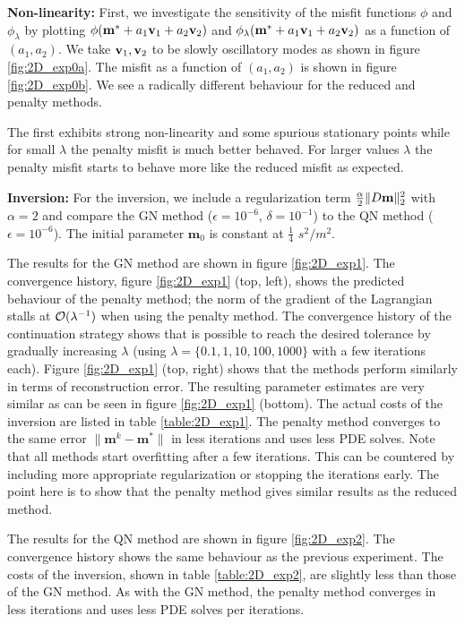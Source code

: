 \documentclass{iopart}
\begin{document}
\textbf{Non-linearity:}
First, we investigate the sensitivity of the misfit functions $\phi$ and $\phi_{\lambda}$ by plotting $\phi(\mathbf{m}^* + a_1 \mathbf{v}_1 + a_2\mathbf{v}_2)$ and $\phi_{\lambda}(\mathbf{m}^* + a_1 \mathbf{v}_1 + a_2\mathbf{v}_2)$ as a function of $(a_1,a_2)$. 
We take $\mathbf{v}_1, \mathbf{v}_2$ to be slowly oscillatory modes as shown in figure \ref{fig:2D_exp0a}. The misfit as a function of $(a_1,a_2)$ is shown in figure \ref{fig:2D_exp0b}. We see a radically different behaviour for the reduced and penalty methods.

The first exhibits strong non-linearity and some spurious stationary points while for small $\lambda$ the penalty misfit is much better behaved. For larger values $\lambda$ the penalty misfit starts to behave more like the reduced misfit as expected.

\textbf{Inversion:}
For the inversion, we include a regularization term $\frac{\alpha}{2} \|D\mathbf{m}\|_2^2$ with $\alpha = 2$ and compare  the GN method ($\epsilon=10^{-6}$, $\delta=10^{-1}$) to the QN method ($\epsilon=10^{-6}$). The initial parameter $\mathbf{m}_0$ is constant at $\frac{1}{4}$ $s^2/m^2$.

The results for the GN method are shown in figure \ref{fig:2D_exp1}.
The convergence history, figure \ref{fig:2D_exp1} (top, left), shows the predicted behaviour of the penalty method; the norm of the gradient of the Lagrangian stalls at $\mathcal{O}(\lambda^{-1})$ when using the penalty method. The convergence history of the continuation strategy shows that is possible to reach the desired tolerance by gradually increasing $\lambda$ (using $\lambda = \{0.1, 1, 10, 100, 1000\}$ with a few iterations each). Figure \ref{fig:2D_exp1} (top, right) shows that the methods perform similarly in terms of reconstruction error. The resulting parameter estimates are very similar as can be seen 
in figure \ref{fig:2D_exp1} (bottom). The actual costs of the inversion are listed in table \ref{table:2D_exp1}. The penalty method converges to the same error $\|\mathbf{m}^k - \mathbf{m}^*\|$ in less iterations and uses less PDE solves. Note that all methods start overfitting after a few iterations. This can be countered by including more appropriate regularization or stopping the iterations early. The point here is to show that the penalty method gives similar results as the reduced method.

The results for the QN method are shown in figure \ref{fig:2D_exp2}. The convergence history shows the same behaviour as the previous experiment. The costs of the inversion, shown in table \ref{table:2D_exp2}, are slightly less than those of the GN method. As with the GN method, the penalty method converges in less iterations and uses less PDE solves per iterations. 
\end{document}
